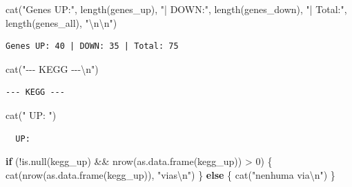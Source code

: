 \documentclass[
  letterpaper,
  DIV=11,
  numbers=noendperiod]{scrreprt}
\newenvironment{Shaded}{\begin{snugshade}}{\end{snugshade}}
\newcommand{\ControlFlowTok}[1]{\textcolor[rgb]{0.00,0.23,0.31}{\textbf{#1}}}
\newcommand{\DecValTok}[1]{\textcolor[rgb]{0.68,0.00,0.00}{#1}}
\newcommand{\FunctionTok}[1]{\textcolor[rgb]{0.28,0.35,0.67}{#1}}
\newcommand{\NormalTok}[1]{\textcolor[rgb]{0.00,0.23,0.31}{#1}}
\newcommand{\SpecialCharTok}[1]{\textcolor[rgb]{0.37,0.37,0.37}{#1}}
\newcommand{\StringTok}[1]{\textcolor[rgb]{0.13,0.47,0.30}{#1}}
\begin{document}
\begin{Shaded}
\begin{Highlighting}[]
\FunctionTok{cat}\NormalTok{(}\StringTok{"Genes UP:"}\NormalTok{, }\FunctionTok{length}\NormalTok{(genes\_up), }\StringTok{"| DOWN:"}\NormalTok{, }\FunctionTok{length}\NormalTok{(genes\_down),}
    \StringTok{"| Total:"}\NormalTok{, }\FunctionTok{length}\NormalTok{(genes\_all), }\StringTok{"}\SpecialCharTok{\textbackslash{}n\textbackslash{}n}\StringTok{"}\NormalTok{)}
\end{Highlighting}
\end{Shaded}

\begin{verbatim}
Genes UP: 40 | DOWN: 35 | Total: 75 
\end{verbatim}

\begin{Shaded}
\begin{Highlighting}[]
\FunctionTok{cat}\NormalTok{(}\StringTok{"{-}{-}{-} KEGG {-}{-}{-}}\SpecialCharTok{\textbackslash{}n}\StringTok{"}\NormalTok{)}
\end{Highlighting}
\end{Shaded}

\begin{verbatim}
--- KEGG ---
\end{verbatim}

\begin{Shaded}
\begin{Highlighting}[]
\FunctionTok{cat}\NormalTok{(}\StringTok{"  UP:   "}\NormalTok{)}
\end{Highlighting}
\end{Shaded}

\begin{verbatim}
  UP:   
\end{verbatim}

\begin{Shaded}
\begin{Highlighting}[]
\ControlFlowTok{if}\NormalTok{ (}\SpecialCharTok{!}\FunctionTok{is.null}\NormalTok{(kegg\_up) }\SpecialCharTok{\&\&} \FunctionTok{nrow}\NormalTok{(}\FunctionTok{as.data.frame}\NormalTok{(kegg\_up)) }\SpecialCharTok{\textgreater{}} \DecValTok{0}\NormalTok{) \{}
  \FunctionTok{cat}\NormalTok{(}\FunctionTok{nrow}\NormalTok{(}\FunctionTok{as.data.frame}\NormalTok{(kegg\_up)), }\StringTok{"vias}\SpecialCharTok{\textbackslash{}n}\StringTok{"}\NormalTok{)}
\NormalTok{\} }\ControlFlowTok{else}\NormalTok{ \{ }\FunctionTok{cat}\NormalTok{(}\StringTok{"nenhuma via}\SpecialCharTok{\textbackslash{}n}\StringTok{"}\NormalTok{) \}}
\end{Highlighting}
\end{Shaded}
\end{document}
